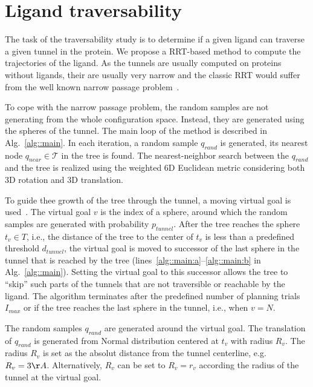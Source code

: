 \documentclass{svmult}
\def\qrand{q_{rand}}
\def\qnear{q_{near}}
\def\T{\mathcal{T}}
\def\C{\mathcal{C}}
\def\dt{d_{tunnel}}
\def\Imax{I_{max}} %
\def\gb{p_{tunnel}}
\begin{document}
\section{Ligand traversability}

The task of the traversability study is to determine if a given ligand can traverse  a given tunnel in the protein.
We propose a RRT-based method to compute the trajectories of the ligand.
As the tunnels are usually computed on proteins without ligands, their are usually very narrow and the classic RRT would
suffer from the well known narrow passage problem~\cite{hannaWIS}.

To cope with the narrow passage problem, the random samples are not generating from the whole configuration space.
Instead, they are generated using the spheres of the tunnel.
The main loop of the method is described in Alg.~\ref{alg::main}.
In each iteration, a random sample $\qrand$ is generated, its nearest node $\qnear\in\T$ in the tree is found.
The nearest-neighbor search between the $\qrand$ and the tree is realized using the weighted 6D Euclidean metric considering
both 3D rotation and 3D translation.

To guide thee growth of the tree through the tunnel, a moving virtual goal is used~\cite{vonasek2009rrt}.
The virtual goal $v$ is the index of a sphere, around which the random samples are generated with probability $\gb$.
After the tree reaches the sphere $t_v \in T$, i.e., the distance of the tree to the center of $t_v$ is
less than a predefined threshold $\dt$, the virtual goal is moved to successor of the last sphere in the tunnel
that is reached by the tree (lines~\ref{alg::main:a}--\ref{alg::main:b} in Alg.~\ref{alg::main}).
Setting the virtual goal to this successor allows the tree to ``skip'' such parts of the tunnels that are
not traversible or reachable by the ligand.
The algorithm terminates after the predefined number of planning trials $\Imax$ or if the tree reaches
the last sphere in the tunnel, i.e., when $v = N$.

The random samples $\qrand$ are generated around the virtual goal.
The translation of $\qrand$ is generated from Normal distribution centered at $t_v$ with radius $R_v$.
The radius $R_v$ is set as the absolut distance from the tunnel centerline, e.g. $R_v=3\AA$.
Alternatively, $R_v$ can be set to $R_v=r_v$ according the radius of the tunnel at the virtual goal.
\end{document}

